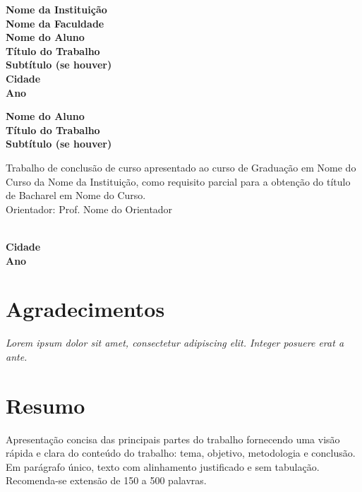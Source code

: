 \documentclass[a4paper,12pt]{report}
\begin{document}
\begin{titlepage}
    \centering
    \vspace*{5cm}
    {\bfseries\Large Nome da Instituição}\\[0.2cm]
    {\bfseries\Large Nome da Faculdade}\\[4cm]
    {\bfseries\Large Nome do Aluno}\\[6cm]
    {\bfseries\Large Título do Trabalho}\\[0.5cm]
    {\bfseries\large Subtítulo (se houver)}\\[6cm]
    {\bfseries\Large Cidade}\\[0.5cm]
    {\bfseries\Large Ano}
\end{titlepage}

\begin{titlepage}
    \centering
    \vspace*{5cm}
    {\bfseries\Large Nome do Aluno}\\[5cm]
    {\bfseries\Large Título do Trabalho}\\[0.5cm]
    {\bfseries\large Subtítulo (se houver)}\\[4cm]
    \hspace{7cm}
    \begin{minipage}{0.5\textwidth}
        \begin{flushright}
            Trabalho de conclusão de curso apresentado ao curso de Graduação em Nome do Curso da Nome da Instituição, como requisito parcial para a obtenção do título de Bacharel em Nome do Curso.\\[2cm]
            Orientador: Prof. Nome do Orientador
        \end{flushright}
    \end{minipage}\\[4cm]
    {\bfseries\Large Cidade}\\[0.5cm]
    {\bfseries\Large Ano}
\end{titlepage}

\chapter*{Agradecimentos}
\begin{flushright}
    \vspace*{5cm}
    \textit{Lorem ipsum dolor sit amet, consectetur adipiscing elit. Integer posuere erat a ante.}
\end{flushright}

\chapter*{Resumo}
Apresentação concisa das principais partes do trabalho fornecendo uma visão rápida e clara do conteúdo do trabalho: tema, objetivo, metodologia e conclusão. Em parágrafo único, texto com alinhamento justificado e sem tabulação. Recomenda-se extensão de 150 a 500 palavras.
\end{document}
